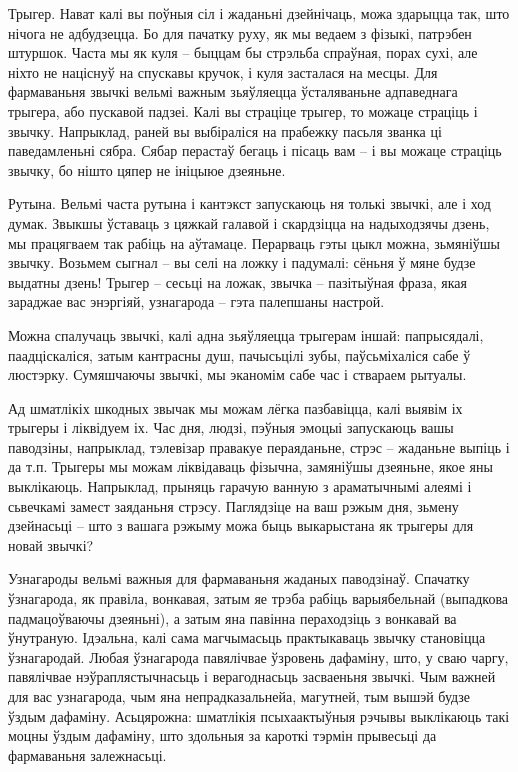 Трыгер. Нават калі вы поўныя сіл і жаданьні дзейнічаць, можа здарыцца так, што нічога не адбудзецца. Бо для пачатку руху, як мы ведаем з фізыкі, патрэбен штуршок. Часта мы як куля – быццам бы стрэльба спраўная, порах сухі, але ніхто не націснуў на спускавы кручок, і куля засталася на месцы. Для фармаваньня звычкі вельмі важным зьяўляецца ўсталяваньне адпаведнага трыгера, або пускавой падзеі. Калі вы страціце трыгер, то можаце страціць і звычку. Напрыклад, раней вы выбіраліся на прабежку пасьля званка ці паведамленьні сябра. Сябар перастаў бегаць і пісаць вам – і вы можаце страціць звычку, бо нішто цяпер не ініцыюе дзеяньне.

Рутына. Вельмі часта рутына і кантэкст запускаюць ня толькі звычкі, але і ход думак. Звыкшы ўставаць з цяжкай галавой і скардзіцца на надыходзячы дзень, мы працягваем так рабіць на аўтамаце. Перарваць гэты цыкл можна, зьмяніўшы звычку. Возьмем сыгнал – вы селі на ложку і падумалі: сёньня ў мяне будзе выдатны дзень! Трыгер – сесьці на ложак, звычка – пазітыўная фраза, якая зараджае вас энэргіяй, узнагарода – гэта палепшаны настрой.

Можна спалучаць звычкі, калі адна зьяўляецца трыгерам іншай: папрысядалі, паадціскаліся, затым кантрасны душ, пачысьцілі зубы, паўсьміхаліся сабе ў люстэрку. Сумяшчаючы звычкі, мы эканомім сабе час і ствараем рытуалы.

Ад шматлікіх шкодных звычак мы можам лёгка пазбавіцца, калі выявім іх трыгеры і ліквідуем іх. Час дня, людзі, пэўныя эмоцыі запускаюць вашы паводзіны, напрыклад, тэлевізар правакуе пераяданьне, стрэс – жаданьне выпіць і да т.п. Трыгеры мы можам ліквідаваць фізычна, замяніўшы дзеяньне, якое яны выклікаюць. Напрыклад, прыняць гарачую ванную з араматычнымі алеямі і сьвечкамі замест заяданьня стрэсу. Паглядзіце на ваш рэжым дня, зьмену дзейнасьці – што з вашага рэжыму можа быць выкарыстана як трыгеры для новай звычкі?

Узнагароды вельмі важныя для фармаваньня жаданых паводзінаў. Спачатку ўзнагарода, як правіла, вонкавая, затым яе трэба рабіць варыябельнай (выпадкова падмацоўваючы дзеяньні), а затым яна павінна пераходзіць з вонкавай ва ўнутраную. Ідэальна, калі сама магчымасьць практыкаваць звычку становіцца ўзнагародай. Любая ўзнагарода павялічвае ўзровень дафаміну, што, у сваю чаргу, павялічвае нэўраплястычнасьць і верагоднасьць засваеньня звычкі. Чым важней для вас узнагарода, чым яна непрадказальнейа, магутней, тым вышэй будзе ўздым дафаміну. Асьцярожна: шматлікія псыхаактыўныя рэчывы выклікаюць такі моцны ўздым дафаміну, што здольныя за кароткі тэрмін прывесьці да фармаваньня залежнасьці.

